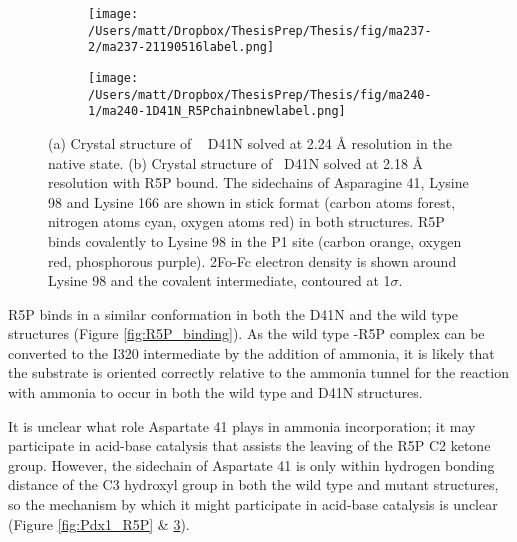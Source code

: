 \begin{figure}[!hbtp]
\centering
\begin{subfigure}{.49\textwidth}
  \centering
  \texttt{[image: /Users/matt/Dropbox/ThesisPrep/Thesis/fig/ma237-2/ma237-21190516label.png]}	
  \caption{}
  \label{fig:D41Nnative} 
\end{subfigure}
\begin{subfigure}{.49\textwidth}
  \centering
  \texttt{[image: /Users/matt/Dropbox/ThesisPrep/Thesis/fig/ma240-1/ma240-1D41N\_R5Pchainbnewlabel.png]}
  \caption{}
 \label{fig:D41NR5P} 
\end{subfigure}
\caption[Crystal structures of \atpdx~D41N in the native and R5P bound states]{(a) Crystal structure of \atpdx~ D41N solved at 2.24 \si{\angstrom} resolution in the native state. (b) Crystal structure of \atpdx~D41N solved at 2.18 \si{\angstrom} resolution with R5P bound. The sidechains of Asparagine 41, Lysine 98 and Lysine 166 are shown in stick format (carbon atoms forest, nitrogen atoms cyan, oxygen atoms red) in both structures. R5P binds covalently to Lysine 98 in the P1 site (carbon orange, oxygen red, phosphorous purple). 2Fo-Fc electron density is shown around Lysine 98 and the covalent intermediate, contoured at 1$\sigma$.}
\end{figure} 

R5P binds in a similar conformation in both the D41N and the wild type structures (Figure \ref{fig:R5P_binding}). As the wild type \atpdx -R5P complex can be converted to the I320 intermediate by the addition of ammonia, it is likely that the substrate is oriented correctly relative to the ammonia tunnel for the reaction with ammonia to occur in both the wild type and D41N structures. 

It is unclear what role Aspartate 41 plays in ammonia incorporation; it may participate in acid-base catalysis that assists the leaving of the R5P C2 ketone group. However, the sidechain of Aspartate 41 is only within hydrogen bonding distance of the C3 hydroxyl group in both the wild type and mutant structures, so the mechanism by which it might participate in acid-base catalysis is unclear (Figure \ref{fig:Pdx1_R5P} \& \ref{fig:D41NR5P}). 


